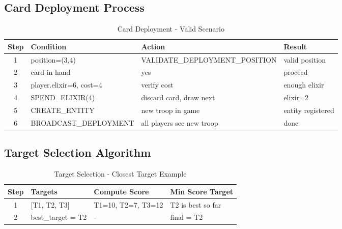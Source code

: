 \documentclass{article}
\begin{document}
\subsection{Card Deployment Process}
\begin{table}[H]
\centering
\footnotesize
\begin{tabular}{|c|l|l|l|}
\hline
\textbf{Step} & \textbf{Condition} & \textbf{Action} & \textbf{Result}\\
\hline
1 & position=(3,4) & VALIDATE\_DEPLOYMENT\_POSITION & valid position \\
\hline
2 & card in hand & yes & proceed \\
\hline
3 & player.elixir=6, cost=4 & verify cost & enough elixir \\
\hline
4 & SPEND\_ELIXIR(4) & discard card, draw next & elixir=2 \\
\hline
5 & CREATE\_ENTITY & new troop in game & entity registered \\
\hline
6 & BROADCAST\_DEPLOYMENT & all players see new troop & done \\
\hline
\end{tabular}
\caption{Card Deployment - Valid Scenario}
\end{table}

\subsection{Target Selection Algorithm}
\begin{table}[H]
\centering
\footnotesize
\begin{tabular}{|c|l|l|l|}
\hline
\textbf{Step} & \textbf{Targets} & \textbf{Compute Score} & \textbf{Min Score Target}\\
\hline
1 & [T1, T2, T3] & T1=10, T2=7, T3=12 & T2 is best so far \\
\hline
2 & best\_target = T2 & - & final = T2 \\
\hline
\end{tabular}
\caption{Target Selection - Closest Target Example}
\end{table}
\end{document}
